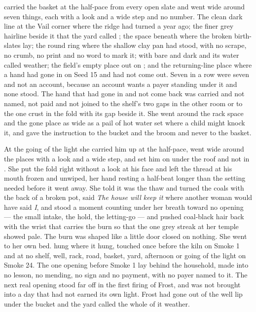  carried the basket at the half-pace from every open slate and went wide around seven things, each with a look and a wide step and no number. The clean dark line at the Vail corner where the  ridge had turned a year ago; the finer grey hairline beside it that the yard called ; the space beneath  where the broken birth-slates lay; the round ring where the shallow clay pan had stood, with no scrape, no crumb, no print and no word to mark it;  with  bare and dark and its water called weather; the field's empty place out on ; and the returning-line place where a hand had gone in on Seed 15 and had not come out. Seven in a row were seven and not an account, because an account wants a payer standing under it and none stood. The hand that had gone in and not come back was carried and not named, not paid and not joined to the shelf's two gaps in the other room or to the one crust in the fold with its gap beside it. She went around the rack space and the gone place as wide as a pail of hot water set where a child might knock it, and gave the instruction to the bucket and the broom and never to the basket.

\scenebreak

At the going of the light she carried him up at the half-pace, went wide around the places with a look and a wide step, and set him on  under the roof and not in . She put the fold right without a look at his face and left the thread at his mouth frozen and unwiped, her hand resting a half-beat longer than the setting needed before it went away. She told  it was the thaw and turned the coals with the back of a broken pot, said \emph{The house will keep it} where another woman would have said \emph{I}, and stood a moment counting under her breath toward no opening --- the small intake, the hold, the letting-go --- and pushed coal-black hair back with the wrist that carries the burn so that the one grey streak at her temple showed pale. The burn was shaped like a little door closed on nothing. She went to her own bed.  hung where it hung, touched once before the kiln on Smoke 1 and at no shelf, well, rack, road, basket, yard, afternoon or going of the light on Smoke 24. The one opening before Smoke 1 lay behind the household, made into no lesson, no mending, no sign and no payment, with no payer named to it. The next real opening stood far off in the first firing of Frost, and was not brought into a day that had not earned its own light. Frost had gone out of the well lip under the bucket and the yard called the whole of it weather.

